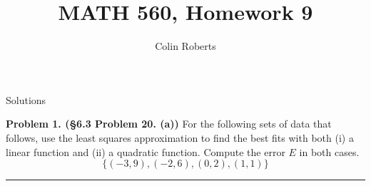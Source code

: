 \documentclass[leqno]{article}
\author{Colin Roberts}
\title{MATH 560, Homework 9}
\theoremstyle{nonumberplain}
\begin{document}
\maketitle
\begin{large}
\begin{center}
Solutions
\end{center}
\end{large}
\pagebreak

\noindent\textbf{Problem 1. (\S 6.3 Problem 20. (a))} For the following sets of data that follows, use the least squares approximation to find the best fits with both (i) a linear function and (ii) a quadratic function. Compute the error $E$ in both cases.
\[
\{(-3,9),(-2,6),(0,2),(1,1)\}
\]

\noindent\rule[0.5ex]{\linewidth}{1pt}
\end{document}

